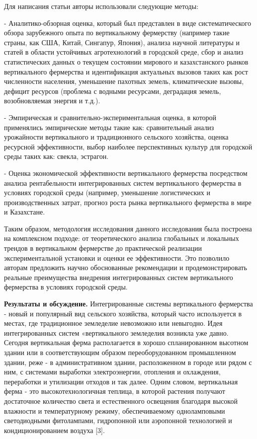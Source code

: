 Для написания статьи авторы использовали следующие методы:

- Аналитико-обзорная оценка, который был представлен в виде
систематического обзора зарубежного опыта по вертикальному фермерству
(например такие страны, как США, Китай, Сингапур, Япония), анализа
научной литературы и статей в области устойчивых агротехнологий в
городской среде, сбор и анализ статистических данных о текущем состоянии
мирового и казахстанского рынков вертикального фермерства и
идентификация актуальных вызовов таких как рост численности населения,
уменьшение пахотных земель, климатические вызовы, дефицит ресурсов
(проблема с водными ресурсами, деградация земель, возобновляемая энергия
и т.д.).

- Эмпирическая и сравнительно-экспериментальная оценка, в которой
применялись эмпирические методы такие как: сравнительный анализ
урожайности вертикального и традиционного сельского хозяйства, оценка
ресурсной эффективности, выбор наиболее перспективных культур для
городской среды таких как: свекла, эстрагон.

- Оценка экономической эффективности вертикального фермерства
посредством анализа рентабельности интегрированных систем вертикального
фермерства в условиях городской среды (например, уменьшение
логистических и производственных затрат, прогноз роста рынка
вертикального фермерства в мире и Казахстане.

Таким образом, методология исследования данного исследования была
построена на комплексном подходе: от теоретического анализа глобальных и
локальных трендов в вертикальном фермерстве до практической реализации
экспериментальной установки и оценки ее эффективности. Это позволило
авторам предложить научно обоснованные рекомендации и продемонстрировать
реальные преимущества внедрения интегрированных систем вертикального
фермерства в условиях городской среды.

{\bfseries Результаты и обсуждение.} Интегрированные системы вертикального
фермерства - новый и популярный вид сельского хозяйства, который часто
используется в местах, где традиционное земледелие невозможно или
невыгодно. Идея интегрированных систем «вертикального земледелия
возникла уже давно. Сегодня вертикальная ферма располагается в хорошо
спланированном высотном здании или в соответствующим образом
переоборудованном промышленном здании, реже - в административном здании,
расположенном в городе или рядом с ним, с системами выработки
электроэнергии, отопления и охлаждения, переработки и утилизации отходов
и так далее. Одним словом, вертикальная ферма - это высокотехнологичная
теплица, в которой растения получают достаточное количество света и
естественного освещения благодаря высокой влажности и температурному
режиму, обеспечиваемому одноламповыми светодиодными фитолампами,
гидропонной или аэропонной технологией и кондиционированием воздуха
{[}3{]}.

